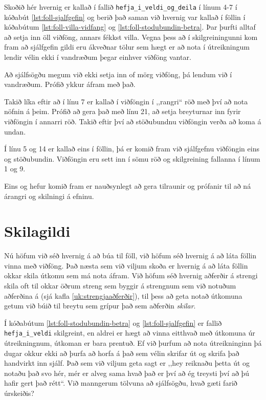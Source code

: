 Skoðið hér hvernig er kallað í fallið \texttt{hefja\_i\_veldi\_og\_deila} í línum 4-7 í kóðabút \ref{lst:foll-sjalfgefin} og berið það saman við hvernig var kallað í föllin í kóðabútum \ref{lst:foll-villa-vidfang} og \ref{lst:foll-stodubundin-betra}.
Þar þurfti alltaf að setja inn öll viðföng, annars fékkst villa. 
Vegna þess að í  skilgreiningunni kom fram að sjálfgefin gildi eru ákveðnar tölur sem hægt er að nota í útreikningum lendir vélin ekki í vandræðum þegar einhver viðföng vantar.

Að sjálfsögðu megum við ekki setja inn of mörg viðföng, þá lendum við í vandræðum.
Prófið ykkur áfram með það.

Takið líka eftir að í línu 7 er kallað í viðföngin í ,,rangri“ röð með því að nota nöfnin á þeim.
Prófið að gera það með línu 21, að setja breyturnar inn fyrir viðföngin í annarri röð.
Takið eftir því að stöðubundnu viðföngin verða að koma á undan.

Í línu 5 og 14 er kallað eins í föllin, þá er komið fram við sjálfgefnu viðföngin eins og stöðubundin.
Viðföngin eru sett inn í sömu röð og skilgreining fallanna í línum 1 og 9.

Eins og hefur komið fram er nauðsynlegt að gera tilraunir og prófanir til að ná árangri og skilningi á efninu.


\section{Skilagildi}\label{uk:skilagildi}
Nú höfum við séð hvernig á að búa til föll, við höfum séð hvernig á að láta föllin vinna með viðföng.
Það næsta sem við viljum skoða er hvernig á að láta föllin okkar skila útkomu sem má nota áfram.
Við höfum séð hvernig aðferðir á strengi skila oft til okkar öðrum streng sem byggir á strengnum sem við notuðum aðferðina á (sjá kafla \ref{uk:strengjaaðferðir}), til þess að geta notað útkomuna getum við búið til breytu sem grípur það sem aðferðin \textit{skilar}.

Í kóðabútum \ref{lst:foll-stodubundin-betra} og \ref{lst:foll-sjalfgefin} er fallið \texttt{hefja\_i\_veldi} skilgreint, en aldrei er hægt að vinna eitthvað með útkomuna úr útreikningnum, útkoman er bara prentuð.
Ef við þurfum að nota útreikninginn þá dugar okkur ekki að þurfa að horfa á það sem vélin skrifar út og skrifa það handvirkt inn sjálf.
Það sem við viljum geta sagt er ,,hey reiknaðu þetta út og notaðu það svo hér, mér er alveg sama hvað það er því að ég treysti því að þú hafir gert það rétt“.
Við manngerum tölvuna að sjálfsögðu, hvað gæti farið úrskeiðis?

